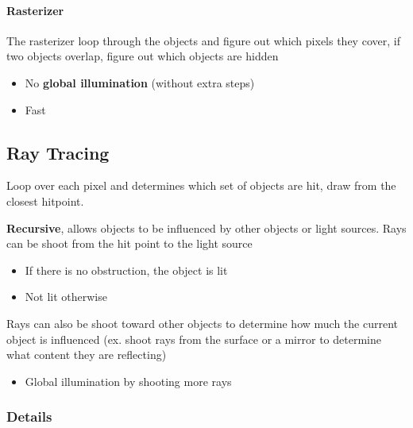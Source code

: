     \paragraph{Rasterizer}
    The rasterizer loop through the objects and figure out which pixels
    they cover, if two objects overlap, figure out which objects are hidden

    \begin{itemize}
      \item No \textbf{global illumination} (without extra steps)
      \item Fast
    \end{itemize}

  \subsection{Ray Tracing}

    Loop over each pixel and determines which set of objects are hit,
    draw from the closest hitpoint.

    \textbf{Recursive}, allows objects to be influenced by other objects
    or light sources. Rays can be shoot from the hit point
    to the light source

    \begin{itemize}
      \item If there is no obstruction, the object is lit
      \item Not lit otherwise
    \end{itemize}

    Rays can also be shoot toward other objects to determine how much the
    current object is influenced (ex. shoot rays from the surface or a
    mirror to determine what content they are reflecting)

    \begin{itemize}
      \item Global illumination by shooting more rays
    \end{itemize}

    \subsubsection{Details}

